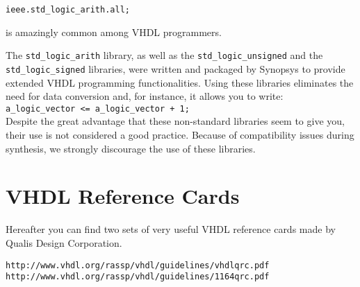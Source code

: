 \noindent
\texttt{ieee.std\_logic\_arith.all;}

\noindent
is amazingly common among VHDL programmers.

The \texttt{std\_logic\_arith} library, as well as the \texttt{std\_logic\_unsigned} and the \texttt{std\_logic\_signed} libraries, were written and packaged by Synopsys to provide extended VHDL programming functionalities. Using these libraries eliminates the need for data conversion and, for instance, it allows you to write:\\
\texttt{a\_logic\_vector <= a\_logic\_vector + 1;}\\
Despite the great advantage that these non-standard libraries seem to give you, their use is not considered a good practice. Because of compatibility issues during synthesis, we strongly discourage the use of these libraries.



\chapter{VHDL Reference Cards}
Hereafter you can find two sets of very useful VHDL reference cards made by Qualis Design Corporation.

\noindent
\begin{verbatim}
http://www.vhdl.org/rassp/vhdl/guidelines/vhdlqrc.pdf
http://www.vhdl.org/rassp/vhdl/guidelines/1164qrc.pdf
\end{verbatim}

\newpage\clearpage
\thispagestyle{empty}


\thispagestyle{empty}
\null\newpage




